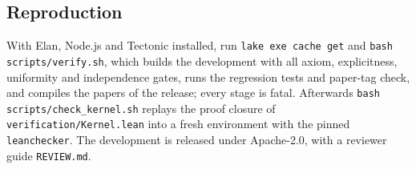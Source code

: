 \subsection*{Reproduction}

With Elan, Node.js and Tectonic installed, run \texttt{lake exe cache get} and \texttt{bash scripts/verify.sh}, which builds the development with all axiom, explicitness, uniformity and independence gates, runs the regression tests and paper-tag check, and compiles the papers of the release; every stage is fatal. Afterwards \texttt{bash scripts/check\_kernel.sh} replays the proof closure of \texttt{verification/Kernel.lean} into a fresh environment with the pinned \texttt{leanchecker}. The development is released under Apache-2.0, with a reviewer guide \texttt{REVIEW.md}.

\endgroup
